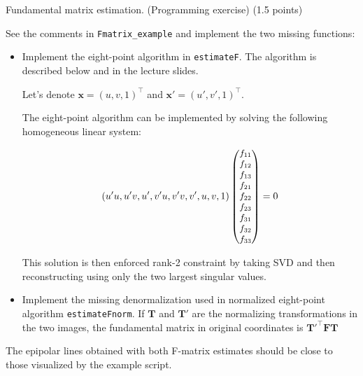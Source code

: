 \documentclass[12pt]{article} %
\newenvironment{exercise}[2][Task]{\begin{trivlist}
\item[\hskip \labelsep {\bfseries #1}\hskip \labelsep {\bfseries #2.}]}{\end{trivlist}}
\begin{document}
\begin{exercise}{2} Fundamental matrix estimation. (Programming exercise) (1.5 points)
	
	\vspace{1mm}
	\noindent See the comments in \texttt{Fmatrix\_example} and implement the two missing functions:
	\begin{itemize}
		\item[\textit{a)}] Implement the eight-point algorithm in \texttt{estimateF}. The algorithm is described below and in the lecture slides.
		\vspace{1mm}
		
		Let's denote $\mathbf{x}=(u,v,1)^\top$ and $\mathbf{x}'=(u',v',1)^\top$.
		
		The eight-point algorithm can be implemented by solving the following homogeneous linear system:
		
		\begin{equation*}
		\small		
		(u'u, u'v, u', v'u, v'v, v',u, v, 1)
		\begin{pmatrix} f_{11} \\ f_{12} \\f_{13} \\f_{21} \\f_{22} \\f_{23} \\f_{31} \\f_{32} \\f_{33} \\ \end{pmatrix} = 0
		\end{equation*}
		
		This solution is then enforced rank-2 constraint by taking SVD and then reconstructing using only the two largest singular values.
		
		\item[\textit{b)}] Implement the missing denormalization used in normalized eight-point algorithm \texttt{estimateFnorm}. If $\mathbf{T}$ and $\mathbf{T}'$ are the normalizing transformations in the
		two images, the fundamental matrix in original
		coordinates is $\mathbf{T}'^\top\mathbf{F}\mathbf{T}$
	\end{itemize}
	
	\noindent The epipolar lines obtained with both F-matrix estimates should be close to those visualized by the example script. 
\end{exercise}
\end{document}
